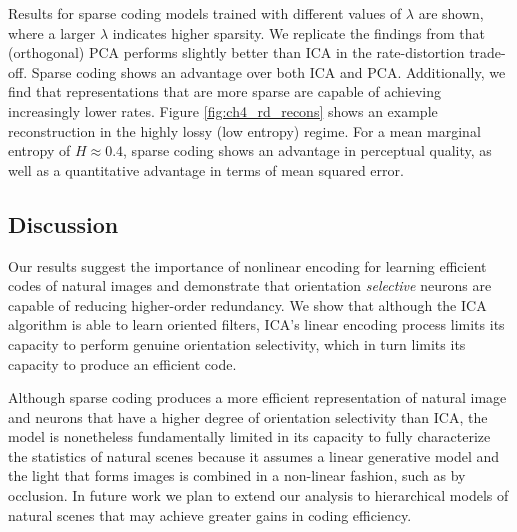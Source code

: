 
Results for sparse coding models trained with different values of $\lambda$ are shown, where a larger $\lambda$ indicates higher sparsity. We replicate the findings from  that (orthogonal) PCA  performs slightly better than ICA in the rate-distortion trade-off. Sparse coding shows an advantage over both ICA and PCA. Additionally, we find that representations that are more sparse are capable of achieving increasingly lower rates. Figure \ref{fig:ch4_rd_recons} shows an example reconstruction in the highly lossy (low entropy) regime. For a mean marginal entropy of $H\approx 0.4$, sparse coding shows an advantage in perceptual quality, as well as a quantitative advantage in terms of mean squared error.



\subsection{Discussion}
Our results suggest the importance of nonlinear encoding for learning efficient codes of natural images and demonstrate that orientation \textit{selective} neurons are capable of reducing higher-order redundancy. We show that although the ICA algorithm is able to learn oriented filters, ICA's linear encoding process limits its capacity to perform genuine orientation selectivity, which in turn limits its capacity to produce an efficient code. 

Although sparse coding produces a more efficient representation of natural image and neurons that have a higher degree of orientation selectivity than ICA, the model is nonetheless fundamentally limited in its capacity to fully characterize the statistics of natural scenes because it assumes a linear generative model and the light that forms images is combined in a non-linear fashion, such as by occlusion. In future work we plan to extend our analysis to hierarchical models of natural scenes that may achieve greater gains in coding efficiency.

